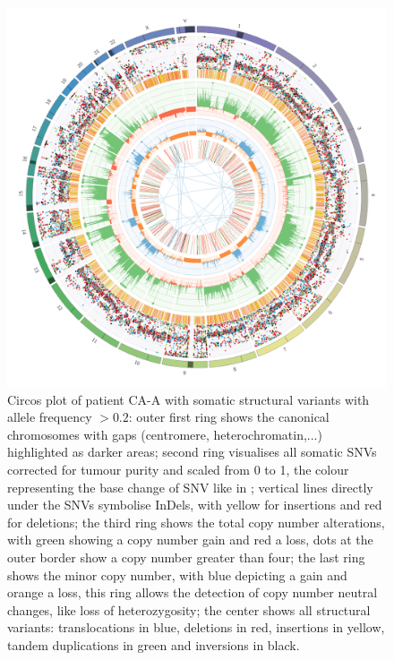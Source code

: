 \begin{figure}[ht]
\centering
\includegraphics[width=.99\linewidth]{Figures/CASCADE/CA99/CA99-11.circos.png}
\caption[Circos plot of patient CA-A sample 11]{Circos plot of patient CA-A with somatic structural variants with allele frequency $> 0.2$: outer first ring shows the canonical chromosomes with gaps (centromere, heterochromatin,...) highlighted as darker areas; second ring visualises all somatic SNVs corrected for tumour purity and scaled from 0 to 1, the colour representing the base change of SNV like in \protect\textcite{Alexandrov2013}; vertical lines directly under the SNVs symbolise InDels, with yellow for insertions and red for deletions; the third ring shows the total copy number alterations, with green showing a copy number gain and red a loss, dots at the outer border show a copy number greater than four; the last ring shows the minor copy number, with blue depicting a gain and orange a loss, this ring allows the detection of copy number neutral changes, like loss of heterozygosity; the center shows all structural variants: translocations in blue, deletions in red, insertions in yellow, tandem duplications in green and inversions in black.} \label{fig:ca99.11circos}
\end{figure}


